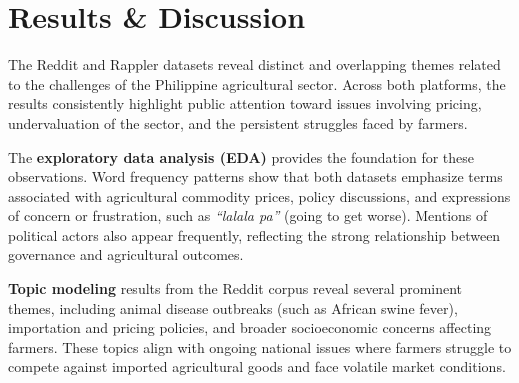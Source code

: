 \documentclass[conference]{IEEEtran}
\begin{document}
\section{Results \& Discussion}





The Reddit and Rappler datasets reveal distinct and overlapping themes related to the 
challenges of the Philippine agricultural sector. Across both platforms, the 
results consistently highlight public attention toward issues involving pricing, 
undervaluation of the sector, and the persistent struggles faced by farmers.

The \textbf{exploratory data analysis (EDA)} provides the foundation for these observations. Word 
frequency patterns show that both datasets emphasize terms associated with agricultural 
commodity prices, policy discussions, and expressions of concern or frustration, such as 
\textit{``lalala pa''} (going to get worse). Mentions of political actors also appear frequently, 
reflecting the strong relationship between governance and agricultural outcomes.

\textbf{Topic modeling} results from the Reddit corpus reveal several prominent themes, including 
animal disease outbreaks (such as African swine fever), importation and pricing policies, 
and broader socioeconomic concerns affecting farmers. These topics align with ongoing 
national issues where farmers struggle to compete against imported agricultural goods and 
face volatile market conditions.
\end{document}
